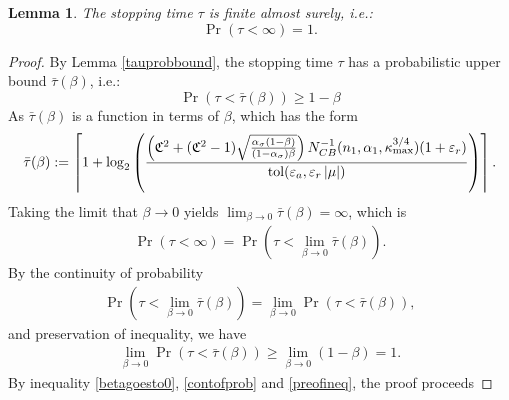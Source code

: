 \documentclass{iitthesis}
\newtheorem{lemma}[theorem]{Lemma}
\theoremstyle{definition}
\begin{document}
\begin{lemma}\label{taufinite}
The stopping time $\tau$ is finite almost surely, i.e.:
$$\Pr(\tau < \infty) = 1.$$
\end{lemma}
\begin{proof}
By Lemma \ref{tauprobbound}, the stopping time $\tau$ has a probabilistic upper bound $\bar{\tau}(\beta)$,  i.e.:
$$\Pr(\tau < \bar{\tau}(\beta)) \geq 1-\beta$$
As $\bar{\tau}(\beta)$ is a function in terms of $\beta$, which has the form
$$\bar{\tau}(\beta):= \left \lceil 1+\log_2 \left(\frac{\left(\mathfrak{C}^2+(\mathfrak{C}^2-1)\sqrt{\frac{\alpha_{\sigma}(1-\beta)}{(1-\alpha_{\sigma})\beta}}\right) N_{CB}^{-1}(n_1,\alpha_1,\kappa_{\max}^{3/4})(1+\varepsilon_r)}{ \operatorname{tol}(\varepsilon_a,\varepsilon_r \left \lvert \mu \right \rvert)}\right) \right \rceil.$$
Taking the limit that $\beta \to 0$ yields $\lim_{\beta \to 0} \bar{\tau}(\beta) = \infty$, which is
\begin{align}\label{betagoesto0}
\Pr(\tau < \infty) = \Pr(\tau  <\lim_{\beta \to 0}\bar{\tau}(\beta)).
\end{align}
By the continuity of probability 
\begin{align}\label{contofprob}
 \Pr(\tau  <\lim_{\beta \to 0}\bar{\tau}(\beta)) =\lim_{\beta \to 0} \Pr(\tau  <\bar{\tau}(\beta)),
\end{align}
and preservation of inequality, we have
\begin{align}\label{preofineq}
\lim_{\beta \to 0} \Pr(\tau  <\bar{\tau}(\beta)) 
\geq \lim_{\beta \to 0}(1-\beta) = 1.
\end{align}
By inequality \eqref{betagoesto0}, \eqref{contofprob} and \eqref{preofineq}, the proof proceeds
\end{proof}
\end{document}
